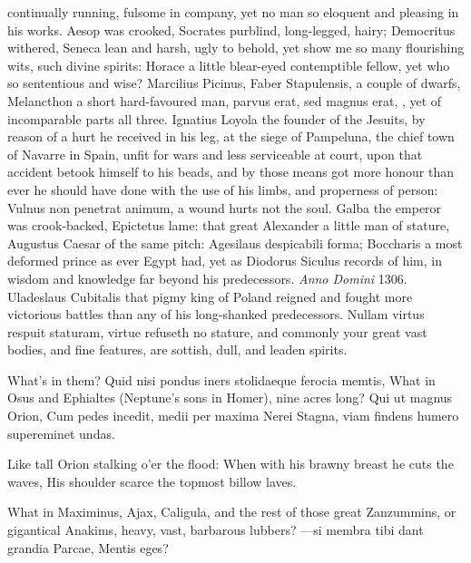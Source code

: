 {continually running, fulsome in company, yet no man so eloquent and
pleasing in his works. Aesop was crooked, Socrates purblind,
long-legged, hairy; Democritus withered, Seneca lean and harsh, ugly to
behold, yet show me so many flourishing wits, such divine spirits:
Horace a little blear-eyed contemptible fellow, yet who so sententious
and wise? Marcilius Picinus, Faber Stapulensis, a couple of dwarfs,
Melancthon a short hard-favoured man, parvus erat, sed magnus
erat, \etc{}, yet of incomparable parts all three. Ignatius Loyola
the founder of the Jesuits, by reason of a hurt he received in his leg,
at the siege of Pampeluna, the chief town of Navarre in Spain, unfit
for wars and less serviceable at court, upon that accident betook
himself to his beads, and by those means got more honour than ever he
should have done with the use of his limbs, and properness of person:
Vulnus non penetrat animum, a wound hurts not the soul. Galba the
emperor was crook-backed, Epictetus lame: that great Alexander a little
man of stature, Augustus Caesar of the same pitch: Agesilaus
despicabili forma; Boccharis a most deformed prince as ever Egypt had,
yet as Diodorus Siculus records of him, in wisdom and knowledge
far beyond his predecessors. \emph{Anno Domini} 1306.  Uladeslaus
Cubitalis that pigmy king of Poland reigned and fought more victorious
battles than any of his long-shanked predecessors. Nullam virtus
respuit staturam, virtue refuseth no stature, and commonly your great
vast bodies, and fine features, are sottish, dull, and leaden spirits.

What's in them? Quid nisi pondus iners stolidaeque ferocia
memtis, What in Osus and Ephialtes (Neptune's sons in Homer), nine
acres long?
Qui ut magnus Orion,
Cum pedes incedit, medii per maxima Nerei
Stagna, viam findens humero supereminet undas.

Like tall Orion stalking o'er the flood:
When with his brawny breast he cuts the waves,
His shoulder scarce the topmost billow laves.

What in Maximinus, Ajax, Caligula, and the rest of those great
Zanzummins, or gigantical Anakims, heavy, vast, barbarous lubbers?
---si membra tibi dant grandia Parcae,
Mentis eges?

}
